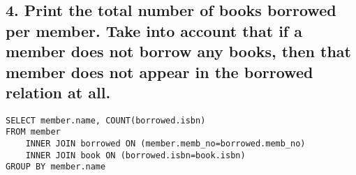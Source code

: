 \documentclass[12pt]{article}
\begin{document}
\subsection*{4. Print the total number of books borrowed per member. Take into account that if a member does not borrow any books, then that member does not appear in the borrowed relation at all. }
%

\begin{lstlisting}
SELECT member.name, COUNT(borrowed.isbn)
FROM member
	INNER JOIN borrowed ON (member.memb_no=borrowed.memb_no)
	INNER JOIN book ON (borrowed.isbn=book.isbn)
GROUP BY member.name	
\end{lstlisting}
\end{document}
